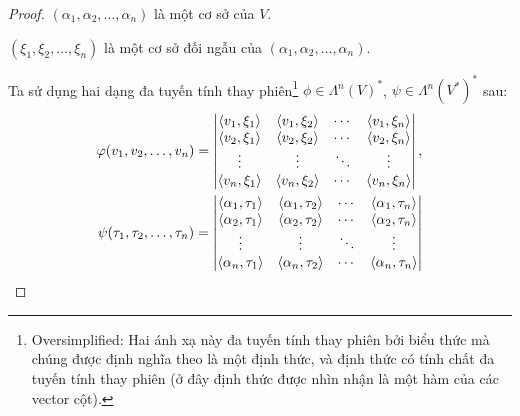 \documentclass[class=nhvh-linear-algebra,crop=false]{standalone}
\begin{document}
\begin{proof}
    \par $(\alpha_{1}, \alpha_{2}, \ldots, \alpha_{n})$ là một cơ sở của $V$.
    \par $(\xi_{1}, \xi_{2}, \ldots, \xi_{n})$ là một cơ sở đối ngẫu của $(\alpha_{1}, \alpha_{2}, \ldots, \alpha_{n})$.
    \par Ta sử dụng hai dạng đa tuyến tính thay phiên\footnote{Oversimplified: Hai ánh xạ này đa tuyến tính thay phiên bởi biểu thức mà chúng được định nghĩa theo là một định thức, và định thức có tính chất đa tuyến tính thay phiên (ở đây định thức được nhìn nhận là một hàm của các vector cột).} $\phi \in {\Lambda^{n}(V)}^{*}$, $\psi \in {\Lambda^{n}({V}^{*})}^{*}$ sau:
    \[
        \begin{split}
            \varphi(v_{1}, v_{2}, \ldots, v_{n}) = \begin{vmatrix}
                                                    \left\langle{v_{1}, \xi_{1}}\right\rangle & \left\langle{v_{1}, \xi_{2}}\right\rangle & \cdots & \left\langle{v_{1}, \xi_{n}}\right\rangle \\
                                                    \left\langle{v_{2}, \xi_{1}}\right\rangle & \left\langle{v_{2}, \xi_{2}}\right\rangle & \cdots & \left\langle{v_{2}, \xi_{n}}\right\rangle \\
                                                    \vdots                   & \vdots                   & \ddots & \vdots                   \\
                                                    \left\langle{v_{n}, \xi_{1}}\right\rangle & \left\langle{v_{n}, \xi_{2}}\right\rangle & \cdots & \left\langle{v_{n}, \xi_{n}}\right\rangle
                                                \end{vmatrix}, \\
            \psi(\tau_{1}, \tau_{2}, \ldots, \tau_{n}) = \begin{vmatrix}
                                                             \left\langle{\alpha_{1}, \tau_{1}}\right\rangle & \left\langle{\alpha_{1}, \tau_{2}}\right\rangle & \cdots & \left\langle{\alpha_{1}, \tau_{n}}\right\rangle \\
                                                             \left\langle{\alpha_{2}, \tau_{1}}\right\rangle & \left\langle{\alpha_{2}, \tau_{2}}\right\rangle & \cdots & \left\langle{\alpha_{2}, \tau_{n}}\right\rangle \\
                                                             \vdots                         & \vdots                         & \ddots & \vdots                         \\
                                                             \left\langle{\alpha_{n}, \tau_{1}}\right\rangle & \left\langle{\alpha_{n}, \tau_{2}}\right\rangle & \cdots & \left\langle{\alpha_{n}, \tau_{n}}\right\rangle

\end{vmatrix}
\end{split}\]
\end{proof}
\end{document}
